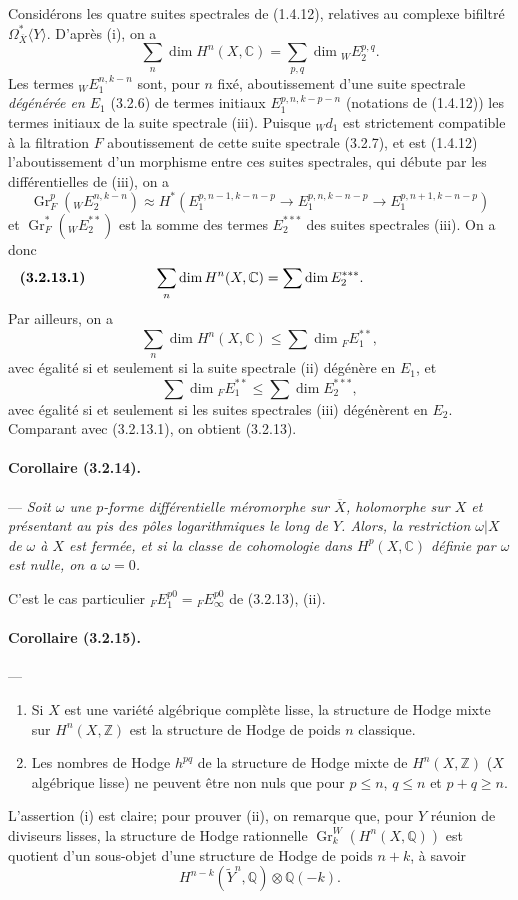 \documentclass[10pt]{article}
\newcommand{\C}{\mathbb C}
\newcommand{\Q}{\mathbb Q}
\newcommand{\Z}{\mathbb Z}
\newcommand{\Gr}{\operatorname{Gr}}
\begin{document}
Considérons les quatre suites spectrales de (1.4.12), relatives au complexe bifiltré $\Omega_{\overline X}^{*}\langle Y\rangle$. D'après (i), on a
\[
\sum_n\dim H^n(X,\C)=\sum_{p,q}\dim {}_WE_2^{p,q}.
\]
Les termes ${}_WE_1^{n,k-n}$ sont, pour $n$ fixé, aboutissement d'une suite spectrale \emph{dégénérée en $E_1$} (3.2.6) de termes initiaux $E_1^{p,n,k-p-n}$ (notations de (1.4.12)) les termes initiaux de la suite spectrale (iii). Puisque ${}_Wd_1$ est strictement compatible à la filtration $F$ aboutissement
de cette suite spectrale (3.2.7), et est (1.4.12) l'aboutissement d'un morphisme entre ces suites spectrales, qui débute par les différentielles de (iii), on a
\[
\Gr_F^p({}_WE_2^{n,k-n})\approx
H^*(E_1^{p,n-1,k-n-p}\to E_1^{p,n,k-n-p}\to E_1^{p,n+1,k-n-p})
\]
et $\Gr_F^*({}_WE_2^{**})$ est la somme des termes $E_2^{***}$ des suites spectrales (iii). On a donc
\[
\makebox[\textwidth][s]{\textbf{(3.2.13.1)}\hfill$\displaystyle \sum_n \dim H^n(X,\C)=\sum\dim E_2^{***}.$\hfill\phantom{\textbf{(3.2.13.1)}}}
\]
Par ailleurs, on a
\[
\sum_n \dim H^n(X,\C)\le \sum \dim {}_F E_1^{**},
\]
avec égalité si et seulement si la suite spectrale (ii) dégénère en $E_1$, et
\[
\sum\dim {}_F E_1^{**}\le \sum\dim E_2^{***},
\]
avec égalité si et seulement si les suites spectrales (iii) dégénèrent en $E_2$. Comparant avec (3.2.13.1), on obtient (3.2.13).

\paragraph{Corollaire (3.2.14).} --- {\itshape Soit $\omega$ une $p$-forme différentielle méromorphe sur $\overline X$, holomorphe sur $X$ et présentant au pis des pôles logarithmiques le long de $Y$. Alors, la restriction $\omega|X$ de $\omega$ à $X$ est fermée, et si la classe de cohomologie dans $H^p(X,\C)$ définie par $\omega$ est nulle, on a $\omega=0$.}

C'est le cas particulier ${}_FE_1^{p0}={}_FE_\infty^{p0}$ de (3.2.13), (ii).

\paragraph{Corollaire (3.2.15).} --- {\itshape
\begin{enumerate}[label=(\roman*),font=\itshape]
\item Si $X$ est une variété algébrique complète lisse, la structure de Hodge mixte sur $H^n(X,\Z)$ est la structure de Hodge de poids $n$ classique.
\item Les nombres de Hodge $h^{pq}$ de la structure de Hodge mixte de $H^n(X,\Z)$ ($X$ algébrique lisse) ne peuvent être non nuls que pour $p\le n$, $q\le n$ et $p+q\ge n$.
\end{enumerate}}
L'assertion (i) est claire; pour prouver (ii), on remarque que, pour $Y$ réunion de diviseurs lisses, la structure de Hodge rationnelle $\Gr_k^W(H^n(X,\Q))$ est quotient d'un sous-objet d'une structure de Hodge de poids $n+k$, à savoir
\[
H^{n-k}(\widetilde Y^n,\Q)\otimes\Q(-k).
\]
\end{document}
